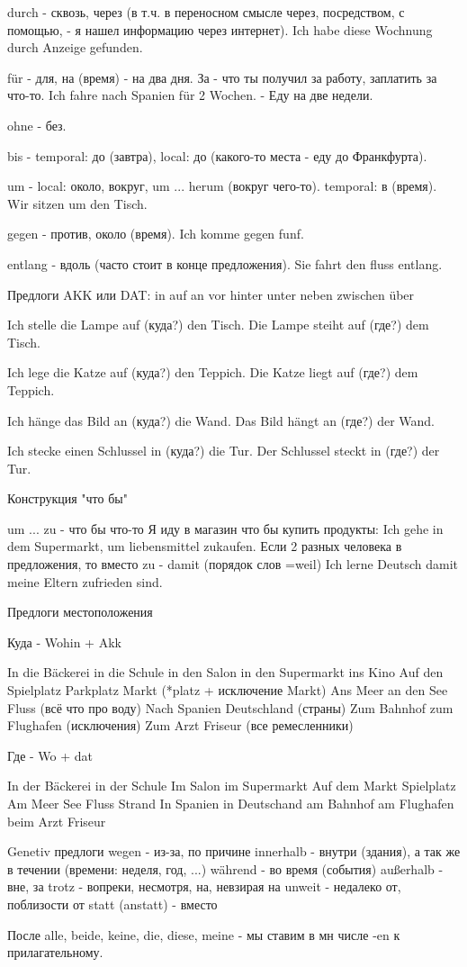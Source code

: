 \documentclass[12pt,a4paper]{report}
\begin{document}
durch - сквозь, через (в т.ч. в переносном смысле через, посредством, с помощью, - я нашел информацию через интернет).
Ich habe diese Wochnung durch Anzeige gefunden.

für - для, на (время) - на два дня. За - что ты получил за работу, заплатить за что-то.
Ich fahre nach Spanien für 2 Wochen. - Еду на две недели.

ohne - без.

bis - temporal: до (завтра), local: до (какого-то места - еду до Франкфурта).

um - local: около, вокруг, um ... herum (вокруг чего-то). temporal: в (время). Wir sitzen um den Tisch.

gegen - против, около (время). Ich komme gegen funf.

entlang - вдоль (часто стоит в конце предложения). Sie fahrt den fluss entlang.

Предлоги AKK или DAT:
in auf an vor hinter unter neben zwischen über

Ich stelle die Lampe auf (куда?) den Tisch.
Die Lampe steiht auf (где?) dem Tisch.

Ich lege die Katze auf (куда?) den Teppich.
Die Katze liegt auf (где?) dem Teppich.

Ich hänge das Bild an (куда?) die Wand.
Das Bild hängt an (где?) der Wand.

Ich stecke einen Schlussel in (куда?) die Tur.
Der Schlussel steckt in (где?) der Tur.

Конструкция "что бы"

um ... zu - что бы что-то
Я иду в магазин что бы купить продукты: Ich gehe in dem Supermarkt, um liebensmittel zukaufen.
Если 2 разных человека в предложения, то вместо zu - damit (порядок слов =weil)
Ich lerne Deutsch damit meine Eltern zufrieden sind.

Предлоги местоположения

Куда - Wohin + Akk

In die Bäckerei in die Schule in den Salon in den Supermarkt ins Kino 
Auf den Spielplatz Parkplatz Markt (*platz + исключение Markt)
Ans Meer an den See Fluss (всё что про воду)
Nach Spanien Deutschland (страны)
Zum Bahnhof zum Flughafen (исключения)
Zum Arzt Friseur (все ремесленники)

Где - Wo + dat

In der Bäckerei in der Schule Im Salon im Supermarkt 
Auf dem Markt  Spielplatz
Am Meer See Fluss Strand
In Spanien in Deutschand
am Bahnhof am Flughafen
beim  Arzt Friseur

Genetiv предлоги
wegen - из-за, по причине
innerhalb - внутри (здания), а так же в течении (времени: неделя, год, ...)
während - во время (события)
außerhalb - вне, за
trotz - вопреки, несмотря, на, невзирая на
unweit - недалеко от, поблизости от
statt (anstatt) - вместо

После alle, beide, keine, die, diese, meine - мы ставим в мн числе -en к прилагательному.
\end{document}
